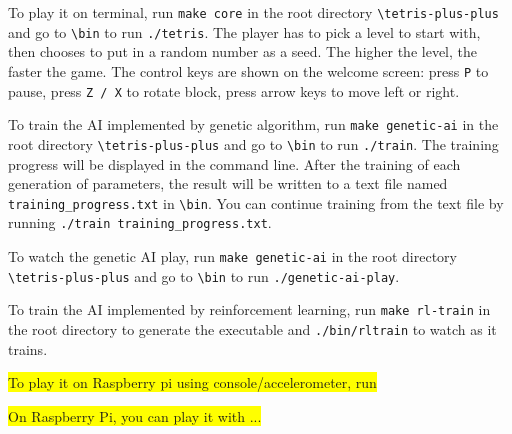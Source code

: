 \documentclass[11pt]{article}
\begin{document}
\begin{flushleft}
To play it on terminal, run \texttt{make core} in the root directory \texttt{\textbackslash tetris-plus-plus} and go to \texttt{\textbackslash bin} to run \texttt{./tetris}. The player has to pick a level to start with, then chooses to put in a random number as a seed. The higher the level, the faster the game. The control keys are shown on the welcome screen: press \texttt{P} to pause, press \texttt{Z / X} to rotate block, press arrow keys to move left or right.
\end{flushleft}

\begin{flushleft}
To train the AI implemented by genetic algorithm, run \texttt{make genetic-ai} in the root directory \texttt{\textbackslash tetris-plus-plus} and go to \texttt{\textbackslash bin} to run \texttt{./train}. The training progress will be displayed in the command line. After the training of each generation of parameters, the result will be written to a text file named \texttt{training\_progress.txt} in \texttt{\textbackslash bin}. You can continue training from the text file by running \texttt{./train training\_progress.txt}.
\end{flushleft}

\begin{flushleft}
To watch the genetic AI play, run \texttt{make genetic-ai} in the root directory \texttt{\textbackslash tetris-plus-plus} and go to \texttt{\textbackslash bin} to run \texttt{./genetic-ai-play}.
\end{flushleft}

\begin{flushleft}
To train the AI implemented by reinforcement learning, run \texttt{make rl-train} in the root directory to generate the executable and \texttt{./bin/rltrain} to watch as it trains.
\end{flushleft}

\begin{flushleft}
\colorbox{yellow}{ To play it on Raspberry pi using console/accelerometer, run }
\end{flushleft}

\begin{flushleft}
\colorbox{yellow}{On Raspberry Pi, you can play it with ...}
\end{flushleft}

\end{document}
